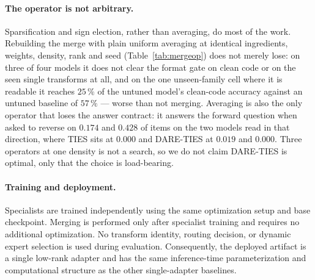 \paragraph{The operator is not arbitrary.} Sparsification and sign election, rather than averaging,
do most of the work. Rebuilding the merge with plain uniform averaging at identical ingredients,
weights, density, rank and seed (Table~\ref{tab:mergeop}) does not merely lose: on three of four
models it does not clear the format gate on clean code or on the seen single transforms at all, and
on the one unseen-family cell where it is readable it reaches $25\,\%$ of the untuned model's
clean-code accuracy against an untuned baseline of $57\,\%$ --- worse than not merging. Averaging is
also the only operator that loses the answer contract: it answers the forward question when asked to
reverse on $0.174$ and $0.428$ of items on the two models read in that direction, where TIES sits at
$0.000$ and DARE-TIES at $0.019$ and $0.000$. Three operators at one density is not a search, so we
do not claim DARE-TIES is optimal, only that the choice is load-bearing.



\paragraph{Training and deployment.}
Specialists are trained independently using the same optimization setup and
base checkpoint. Merging is performed only after specialist training and
requires no additional optimization. No transform identity, routing decision,
or dynamic expert selection is used during evaluation. Consequently, the
deployed artifact is a single low-rank adapter and has the same inference-time
parameterization and computational structure as the other single-adapter
baselines.
